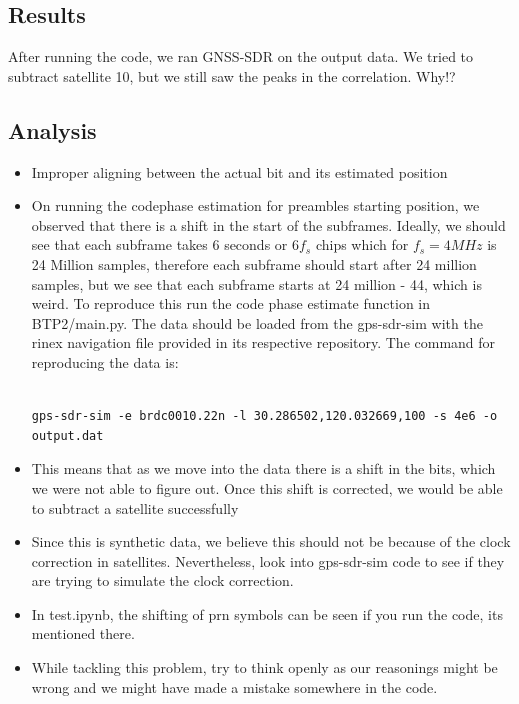 \documentclass[12pt]{report}
\begin{document}
\subsection{Results}
After running the code, we ran GNSS-SDR on the output data. We tried to subtract satellite 10, but we still saw the peaks in the correlation. Why!?
\subsection{Analysis}
\begin{itemize}
  \item Improper aligning between the actual bit and its estimated position
  \item On running the codephase estimation for preambles starting position, we observed that there is a shift in the start of the subframes. Ideally, we should see that
each subframe takes 6 seconds or $6f_s$ chips which for $f_s = 4MHz$ is 24 Million samples, therefore each subframe should start after 24 million samples, but we see that each subframe starts at 24 million - 44, which is weird. 
To reproduce this run the code phase estimate function in BTP2/main.py. The data should be loaded from the gps-sdr-sim with the rinex navigation file provided in its respective repository. 
The command for reproducing the data is:

\begin{verbatim}

gps-sdr-sim -e brdc0010.22n -l 30.286502,120.032669,100 -s 4e6 -o output.dat
\end{verbatim}


  \item This means that as we move into the data there is a shift in the bits, which we were not able to figure out. Once this shift is corrected, we would be able to subtract a satellite successfully
  \item Since this is synthetic data, we believe this should not be because of the clock correction in satellites. Nevertheless, look into gps-sdr-sim code to see if they are trying to simulate the clock correction.
  \item In test.ipynb, the shifting of prn symbols can be seen if you run the code, its mentioned there.
  \item While tackling this problem, try to think openly as our reasonings might be wrong and we might have made a mistake somewhere in the code.
\end{itemize}
\end{document}
